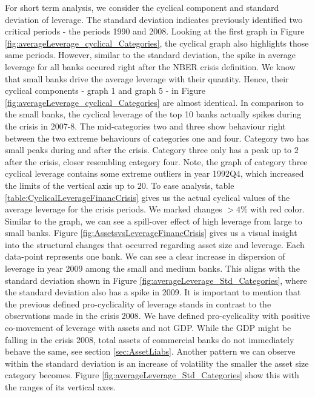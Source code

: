 \documentclass[12pt, a4paper]{article} %
\begin{document}
For short term analysis, we consider the cyclical component and standard deviation of leverage. The standard deviation indicates previously identified two critical periods - the periods 1990 and 2008. Looking at the first graph in Figure \ref{fig:averageLeverage_cyclical_Categories}, the cyclical graph also highlights those same periods. However, similar to the standard deviation, the spike in average leverage for all banks occured right after the NBER crisis definition. We know that small banks drive the average leverage with their quantity. Hence, their cyclical components - graph 1 and graph 5 - in Figure \ref{fig:averageLeverage_cyclical_Categories} are almost identical. In comparison to the small banks, the cyclical leverage of the top 10 banks actually spikes during the crisis in 2007-8. The mid-categories two and three show behaviour right between the two extreme behaviours of categories one and four. Category two has small peaks during and after the crisis. Category three only has a peak up to $2$ after the crisis, closer resembling category four. Note, the graph of category three cyclical leverage contains some extreme outliers in year 1992Q4, which increased the limits of the vertical axis up to $20$. To ease analysis, table \ref{table:CyclicalLeverageFinancCrisis} gives us the actual cyclical values of the average leverage for the crisis periods. We marked changes $>4\%$ with red color. Similar to the graph, we can see a spill-over effect of high leverage from large to small banks. Figure \ref{fig:AssetsvsLeverageFinancCrisis} gives us a visual insight into the structural changes that occurred regarding asset size and leverage. Each data-point represents one bank. We can see a clear increase in dispersion of leverage in year 2009 among the small and medium banks. This aligns with the standard deviation shown in Figure \ref{fig:averageLeverage_Std_Categories}, where the standard deviation also has a spike in 2009. It is important to mention that the previous defined pro-cyclicality of leverage stands in contrast to the observations made in the crisis 2008. We have defined pro-cyclicality with positive co-movement of leverage with assets and not GDP. While the GDP might be falling in the crisis 2008, total assets of commercial banks do not immediately behave the same, see section \ref{sec:AssetLiabs}.  
Another pattern we can observe within the standard deviation is an increase of volatility the smaller the asset size category becomes. Figure \ref{fig:averageLeverage_Std_Categories} show this with the ranges of its vertical axes.   
\end{document}
